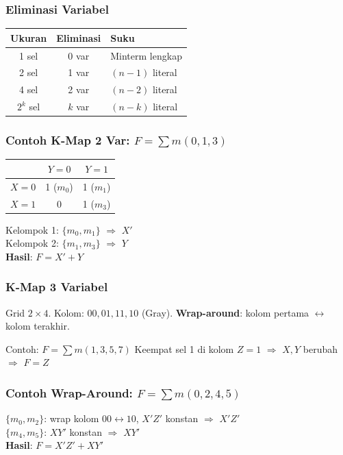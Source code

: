 \documentclass[handout]{beamer}
\theoremstyle{definition}
\theoremstyle{example}
\begin{document}
\begin{frame}
\frametitle{Eliminasi Variabel}
\begin{center}
\small
\begin{tabular}{|c|c|l|}
\hline
\textbf{Ukuran} & \textbf{Eliminasi} & \textbf{Suku} \\ \hline
1 sel & 0 var & Minterm lengkap \\ \hline
2 sel & 1 var & $(n-1)$ literal \\ \hline
4 sel & 2 var & $(n-2)$ literal \\ \hline
$2^k$ sel & $k$ var & $(n-k)$ literal \\ \hline
\end{tabular}
\end{center}
\end{frame}

\begin{frame}
\frametitle{Contoh K-Map 2 Var: $F = \sum m(0,1,3)$}
\begin{center}
\small
\begin{tabular}{|c|c|c|}
\hline
 & $Y=0$ & $Y=1$ \\ \hline
$X=0$ & 1 ($m_0$) & 1 ($m_1$) \\ \hline
$X=1$ & 0 & 1 ($m_3$) \\ \hline
\end{tabular}
\end{center}
Kelompok 1: $\{m_0, m_1\}$ $\Rightarrow$ $X'$\\
Kelompok 2: $\{m_1, m_3\}$ $\Rightarrow$ $Y$\\
\textbf{Hasil}: $F = X' + Y$
\end{frame}

\begin{frame}
\frametitle{K-Map 3 Variabel}
Grid $2 \times 4$. Kolom: $00, 01, 11, 10$ (Gray). \textbf{Wrap-around}: kolom pertama $\leftrightarrow$ kolom terakhir.
\begin{block}{Contoh: $F = \sum m(1,3,5,7)$}
Keempat sel 1 di kolom $Z=1$ $\Rightarrow$ $X,Y$ berubah $\Rightarrow$ $F = Z$
\end{block}
\end{frame}

\begin{frame}
\frametitle{Contoh Wrap-Around: $F = \sum m(0,2,4,5)$}
$\{m_0, m_2\}$: wrap kolom $00 \leftrightarrow 10$, $X'Z'$ konstan $\Rightarrow$ $X'Z'$\\
$\{m_4, m_5\}$: $XY'$ konstan $\Rightarrow$ $XY'$\\
\textbf{Hasil}: $F = X'Z' + XY'$
\end{frame}
\end{document}
